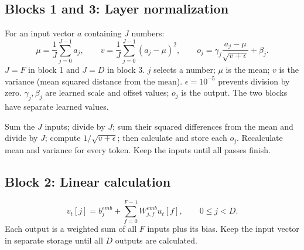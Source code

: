 \documentclass[11pt,a4paper]{article}
\begin{document}
\subsection*{Blocks 1 and 3: Layer normalization}
For an input vector $a$ containing $J$ numbers:
\[
\mu=\frac1J\sum_{j=0}^{J-1}a_j,\qquad
v=\frac1J\sum_{j=0}^{J-1}(a_j-\mu)^2,\qquad
o_j=\gamma_j\frac{a_j-\mu}{\sqrt{v+\epsilon}}+\beta_j.
\]
$J=F$ in block 1 and $J=D$ in block 3. $j$ selects a number; $\mu$ is the mean; $v$ is the variance (mean squared distance from the mean). $\epsilon=10^{-5}$ prevents division by zero. $\gamma_j,\beta_j$ are learned scale and offset values; $o_j$ is the output. The two blocks have separate learned values.
\begin{center}
\end{center}
Sum the $J$ inputs; divide by $J$; sum their squared differences from the mean and divide by $J$; compute $1/\sqrt{v+\epsilon}$; then calculate and store each $o_j$. Recalculate mean and variance for every token. Keep the inputs until all passes finish.

\subsection*{Block 2: Linear calculation}
\[
v_t[j]=b^{emb}_j+\sum_{f=0}^{F-1}W^{emb}_{j,f}u_t[f],\qquad 0\leq j<D.
\]
Each output is a weighted sum of all $F$ inputs plus its bias. Keep the input vector in separate storage until all $D$ outputs are calculated.
\end{document}
